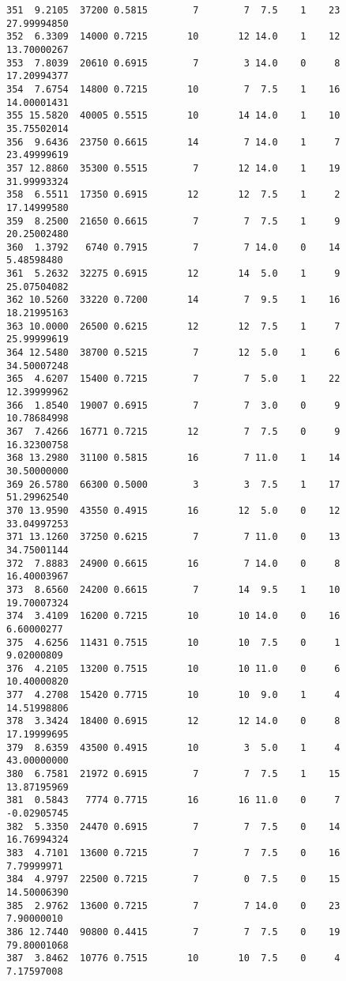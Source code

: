 \documentclass[
  letterpaper,
  DIV=11,
  numbers=noendperiod]{scrreprt}
\begin{document}
\begin{verbatim}
351  9.2105  37200 0.5815        7        7  7.5    1    23 27.99994850
352  6.3309  14000 0.7215       10       12 14.0    1    12 13.70000267
353  7.8039  20610 0.6915        7        3 14.0    0     8 17.20994377
354  7.6754  14800 0.7215       10        7  7.5    1    16 14.00001431
355 15.5820  40005 0.5515       10       14 14.0    1    10 35.75502014
356  9.6436  23750 0.6615       14        7 14.0    1     7 23.49999619
357 12.8860  35300 0.5515        7       12 14.0    1    19 31.99993324
358  6.5511  17350 0.6915       12       12  7.5    1     2 17.14999580
359  8.2500  21650 0.6615        7        7  7.5    1     9 20.25002480
360  1.3792   6740 0.7915        7        7 14.0    0    14  5.48598480
361  5.2632  32275 0.6915       12       14  5.0    1     9 25.07504082
362 10.5260  33220 0.7200       14        7  9.5    1    16 18.21995163
363 10.0000  26500 0.6215       12       12  7.5    1     7 25.99999619
364 12.5480  38700 0.5215        7       12  5.0    1     6 34.50007248
365  4.6207  15400 0.7215        7        7  5.0    1    22 12.39999962
366  1.8540  19007 0.6915        7        7  3.0    0     9 10.78684998
367  7.4266  16771 0.7215       12        7  7.5    0     9 16.32300758
368 13.2980  31100 0.5815       16        7 11.0    1    14 30.50000000
369 26.5780  66300 0.5000        3        3  7.5    1    17 51.29962540
370 13.9590  43550 0.4915       16       12  5.0    0    12 33.04997253
371 13.1260  37250 0.6215        7        7 11.0    0    13 34.75001144
372  7.8883  24900 0.6615       16        7 14.0    0     8 16.40003967
373  8.6560  24200 0.6615        7       14  9.5    1    10 19.70007324
374  3.4109  16200 0.7215       10       10 14.0    0    16  6.60000277
375  4.6256  11431 0.7515       10       10  7.5    0     1  9.02000809
376  4.2105  13200 0.7515       10       10 11.0    0     6 10.40000820
377  4.2708  15420 0.7715       10       10  9.0    1     4 14.51998806
378  3.3424  18400 0.6915       12       12 14.0    0     8 17.19999695
379  8.6359  43500 0.4915       10        3  5.0    1     4 43.00000000
380  6.7581  21972 0.6915        7        7  7.5    1    15 13.87195969
381  0.5843   7774 0.7715       16       16 11.0    0     7 -0.02905745
382  5.3350  24470 0.6915        7        7  7.5    0    14 16.76994324
383  4.7101  13600 0.7215        7        7  7.5    0    16  7.79999971
384  4.9797  22500 0.7215        7        0  7.5    0    15 14.50006390
385  2.9762  13600 0.7215        7        7 14.0    0    23  7.90000010
386 12.7440  90800 0.4415        7        7  7.5    0    19 79.80001068
387  3.8462  10776 0.7515       10       10  7.5    0     4  7.17597008

\end{verbatim}
\end{document}
